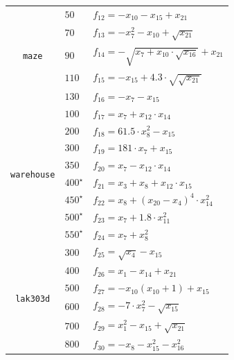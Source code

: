 \documentclass[letterpaper]{article}
\begin{document}
\begin{table}[t!]
{\begin{adjustbox}{width=0.1\columnwidth}
\begin{tabular}{c|l|l}
            \multirow{5}{*}{\begin{turn}{90} {\tt maze} \end{turn}}
            & $ 50 $ & $ f_{12} = - x_{10}- x_{15} + x_{21} $ \\
            & $ 70 $ & $ f_{13} = - x_{7}^2 - x_{10} + \sqrt{x_{21}} $ \\
            & $ 90 $ & $ f_{14} = - \sqrt{x_{7} + x_{10} \cdot \sqrt{x_{16}}} + x_{21} $ \\
            & $ 110 $ & $ f_{15} = - x_{15} + 4.3 \cdot \sqrt{\sqrt{x_{21}}} $ \\
            & $ 130 $ & $ f_{16} = - x_{7} - x_{15} $ \\
            \hline
            \multirow{8}{*}{\begin{turn}{90} {\tt warehouse} \end{turn}}
            & $ 100 $ & $ f_{17} = x_{7} + x_{12} \cdot x_{14} $ \\
            & $ 200 $ & $ f_{18} = 61.5 \cdot x_{8}^2 - x_{15} $ \\
            & $ 300 $ & $ f_{19} = 181 \cdot x_{7} + x_{15} $ \\
            & $ 350 $ & $ f_{20} = x_{7} - x_{12} \cdot x_{14} $ \\
            & $ 400^\star $ & $ f_{21} = x_{3} + x_{8} + x_{12} \cdot x_{15} $ \\
            & $ 450^\star $ & $ f_{22} = x_{8} + \left(x_{20} - x_{4}\right)^4 \cdot x_{14}^2 $ \\
            & $ 500^\star $ & $ f_{23} = x_{7} + 1.8 \cdot x_{11}^2 $ \\
            & $ 550^\star $ & $ f_{24} = x_{7} + x_{8}^2 $ \\
            \hline
            \multirow{7}{*}{\begin{turn}{90} {\tt lak303d} \end{turn}}
            & $ 300 $ & $ f_{25} = \sqrt{x_{4}} - x_{15} $ \\
            & $ 400 $ & $ f_{26} = x_{1} - x_{14} + x_{21} $ \\
            & $ 500 $ & $ f_{27} = - x_{10}(x_{10} + 1) + x_{15} $ \\
            & $ 600 $ & $ f_{28} = - 7 \cdot x_{7}^2 - \sqrt{x_{15}} $ \\
            & $ 700 $ & $ f_{29} = x_{1}^2 - x_{15} + \sqrt{x_{21}} $ \\
            & $ 800 $ & $ f_{30} = -x_{8} - x_{15}^2 - x_{16}^2 $ \\

\end{tabular}
\end{adjustbox}}
\end{table}
\end{document}
